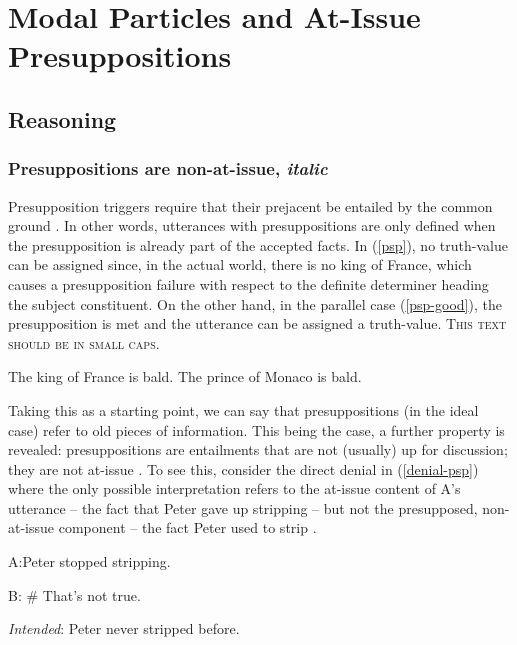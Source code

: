 \chapter{Modal Particles and At-Issue Presuppositions}

\section{Reasoning}

\subsection{Presuppositions are non-at-issue, \textit{italic}}

Presupposition triggers require that their prejacent be entailed by the common ground \parencite{stalnaker2002common}. In other words,
utterances with presuppositions are only defined when the presupposition is already part of the
accepted facts. In (\ref{psp}), no truth-value can be assigned since, in the actual world, there is no king of
France, which causes a presupposition failure with respect to the definite determiner heading the
subject constituent. On the other hand, in the parallel case (\ref{psp-good}), the presupposition is
met and the utterance can be assigned a truth-value. \textsc{This text should be in small caps}.

\begin{exe}
    \ex \begin{xlist}
        \ex\label{psp}The king of France is bald.
        \ex\label{psp-good} The prince of Monaco is bald.
    \end{xlist}
\end{exe}

Taking this as a starting point, we can say that presuppositions (in the ideal case) refer to old
pieces of information. This being the case, a further property is revealed: presuppositions are
entailments that are not (usually) up for discussion; they are not at-issue
\parencite{aravind2017factivity}. To see this, consider the direct denial in (\ref{denial-psp})
where the only possible interpretation refers to the at-issue content of A's utterance -- the fact
that Peter gave up stripping -- but not the presupposed, non-at-issue component -- the fact Peter
used to strip \parencite[cf.][]{tonhauser2012diagnosing}.

\begin{exe}
    \ex\label{denial-psp}A:\@ Peter stopped stripping.

    B: \# That's not true.

    \textit{Intended}: Peter never stripped before.
\end{exe}

